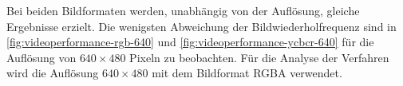 Bei beiden Bildformaten werden, unabhängig von der Auflösung, gleiche Ergebnisse erzielt. Die wenigsten Abweichung der
 Bildwiederholfrequenz sind in \autoref{fig:videoperformance-rgb-640} und \autoref{fig:videoperformance-ycbcr-640} für die
 Auflösung von $640 \times 480$ Pixeln zu beobachten. Für die Analyse der Verfahren wird die Auflösung
 $640 \times 480$ mit dem Bildformat RGBA verwendet.

